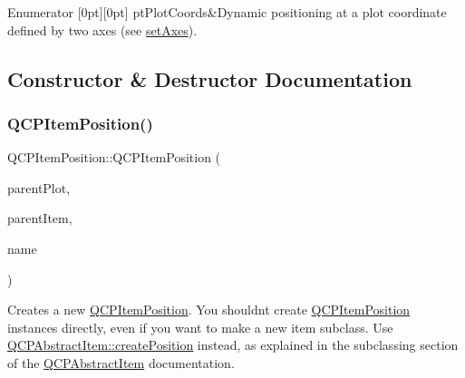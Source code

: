 \begin{DoxyEnumFields}{Enumerator}
[0pt][0pt]{}\mbox{\label{class_q_c_p_item_position_aad9936c22bf43e3d358552f6e86dbdc8ad5ffb8dc99ad73263f7010c77342294c}} 
pt\+Plot\+Coords&Dynamic positioning at a plot coordinate defined by two axes (see \mbox{\hyperlink{class_q_c_p_item_position_a2185f45c75ac8cb9be89daeaaad50e37}{set\+Axes}}). \\
\hline

\end{DoxyEnumFields}


\subsection{Constructor \& Destructor Documentation}
\mbox{\label{class_q_c_p_item_position_a6519a552bd9766354644ec24d1f26622}} 
\subsubsection{\texorpdfstring{QCPItemPosition()}{QCPItemPosition()}}
{\footnotesize\ttfamily Q\+C\+P\+Item\+Position\+::\+Q\+C\+P\+Item\+Position (\begin{DoxyParamCaption}\item[{\mbox{\hyperlink{class_q_custom_plot}{Q\+Custom\+Plot}} $\ast$}]{parent\+Plot,  }\item[{\mbox{\hyperlink{class_q_c_p_abstract_item}{Q\+C\+P\+Abstract\+Item}} $\ast$}]{parent\+Item,  }\item[{const Q\+String \&}]{name }\end{DoxyParamCaption})}

Creates a new \mbox{\hyperlink{class_q_c_p_item_position}{Q\+C\+P\+Item\+Position}}. You shouldn\textquotesingle{}t create \mbox{\hyperlink{class_q_c_p_item_position}{Q\+C\+P\+Item\+Position}} instances directly, even if you want to make a new item subclass. Use \mbox{\hyperlink{class_q_c_p_abstract_item_a75036d39c4d4e2e1a7dd145fff915d32}{Q\+C\+P\+Abstract\+Item\+::create\+Position}} instead, as explained in the subclassing section of the \mbox{\hyperlink{class_q_c_p_abstract_item}{Q\+C\+P\+Abstract\+Item}} documentation. \mbox{\label{class_q_c_p_item_position_ad8a289016f7a62332f9c865c39ab2047}} 
